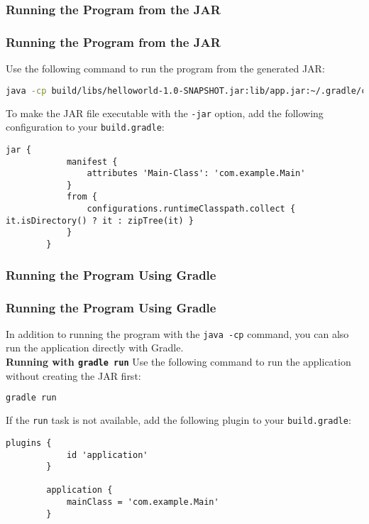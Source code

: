 \documentclass[aspectratio=169, table]{beamer}
\begin{document}
\subsubsection{Running the Program from the JAR}
\begin{frame}[fragile]
	\vspace{20pt}
	\frametitle{Running the Program from the JAR}
	Use the following command to run the program from the generated JAR:
	\begin{lstlisting}[language=bash]
		java -cp build/libs/helloworld-1.0-SNAPSHOT.jar:lib/app.jar:~/.gradle/caches/modules-2/files-2.1/com.google.guava/guava/31.1-jre com.example.Main
	\end{lstlisting}
	To make the JAR file executable with the \texttt{-jar} option, add the following configuration to your \texttt{build.gradle}:
	\begin{lstlisting}[style=XmlStyle]
		jar {
			manifest {
				attributes 'Main-Class': 'com.example.Main'
			}
			from {
				configurations.runtimeClasspath.collect { it.isDirectory() ? it : zipTree(it) }
			}
		}
	\end{lstlisting}
\end{frame}

\subsubsection{Running the Program Using Gradle}
\begin{frame}[fragile]
	\vspace{20pt}
	\frametitle{Running the Program Using Gradle}
	In addition to running the program with the \texttt{java -cp} command, you can also run the application directly with Gradle.\\
	\textbf{Running with \texttt{gradle run}}
	Use the following command to run the application without creating the JAR first:
	\begin{lstlisting}[language=bash]
		gradle run
	\end{lstlisting}
	If the \texttt{run} task is not available, add the following plugin to your \texttt{build.gradle}:
	\begin{lstlisting}[style=XmlStyle]
		plugins {
			id 'application'
		}
		
		application {
			mainClass = 'com.example.Main'
		}
	\end{lstlisting}
\end{frame}
\end{document}
